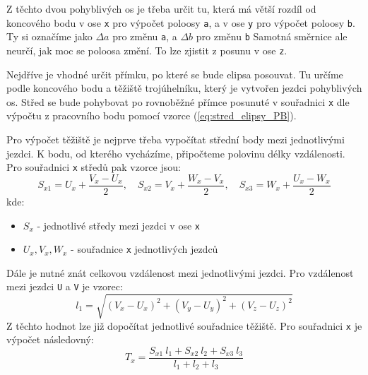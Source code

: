         Z těchto dvou pohyblivých os je třeba určit tu, která má větší rozdíl od koncového 
        bodu v ose \texttt{x} pro výpočet poloosy \texttt{a}, a v ose \texttt{y} pro 
        výpočet poloosy \texttt{b}. Ty si označíme jako $\Delta a$ pro změnu \texttt{a},
        a $\Delta b$ pro změnu \texttt{b} Samotná směrnice ale neurčí, jak moc se poloosa 
        změní. To lze zjistit z posunu v ose \texttt{z}.

        Nejdříve je vhodné určit přímku, po které se bude elipsa posouvat. Tu určíme podle 
        koncového bodu a těžiště trojúhelníku, který je vytvořen jezdci pohyblivých os.
        Střed se bude pohybovat po rovnoběžné přímce posunuté v souřadnici \texttt{x}
        dle výpočtu z pracovního bodu pomocí vzorce (\ref{eq:stred_elipsy_PB}).

        Pro výpočet těžiště je nejprve třeba vypočítat střední body mezi jednotlivými 
        jezdci. K bodu, od kterého vycházíme, připočteme polovinu délky vzdálenosti.
        Pro souřadnici \texttt{x} středů pak vzorce jsou:
        \begin{equation}
            S_{x1} = U_x + \frac{V_x - U_x}{2}, \quad S_{x2} = V_x + \frac{W_x - V_x}{2},
            \quad S_{x3} = W_x + \frac{U_x - W_x}{2}
            \label{eq:stredy_teziste}
        \end{equation}
        kde:
        \begin{itemize}
            \item []$S_x$ - jednotlivé středy mezi jezdci v ose \texttt{x}
            \item []$U_x,V_x,W_x$ - souřadnice \texttt{x} jednotlivých jezdců
        \end{itemize}
        Dále je nutné znát celkovou vzdálenost mezi jednotlivými jezdci. Pro vzdálenost
        mezi jezdci \texttt{U} a \texttt{V} je vzorec:
        \begin{equation}
            l_1 = \sqrt{(V_x - U_x)^2 + (V_y - U_y)^2 + (V_z - U_z)^2}
            \label{eq:vzdalenost_jezdcu}
        \end{equation}
        Z těchto hodnot lze již dopočítat jednotlivé souřadnice těžiště. Pro souřadnici
        \texttt{x} je výpočet následovný:
        \begin{equation}
            T_x = \frac{S_{x1}\ l_1 + S_{x2}\ l_2 + S_{x3}\ l_3}{l_1 + l_2 + l_3}
            \label{eq:teziste_x}
        \end{equation}

